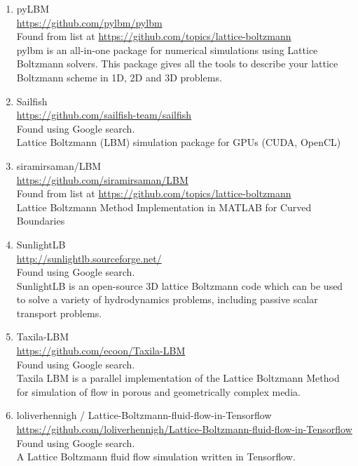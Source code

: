 \documentclass{article}
\begin{document}
\begin{enumerate}
	\item pyLBM
\\
	\href{https://github.com/pylbm/pylbm}{https://github.com/pylbm/pylbm}
\\
		Found from list at \href{https://github.com/topics/lattice-boltzmann}{https://github.com/topics/lattice-boltzmann}\\
	pylbm is an all-in-one package for numerical simulations using Lattice Boltzmann solvers.
	This package gives all the tools to describe your lattice Boltzmann scheme in 1D, 2D and 3D problems.
	
	\item Sailfish \\
	\href{https://github.com/sailfish-team/sailfish}{https://github.com/sailfish-team/sailfish}
\\
	Found using Google search.\\
	Lattice Boltzmann (LBM) simulation package for GPUs (CUDA, OpenCL)
	
	\item siramirsaman/LBM
\\
	\href{https://github.com/siramirsaman/LBM}{https://github.com/siramirsaman/LBM}
\\
		Found from list at \href{https://github.com/topics/lattice-boltzmann}{https://github.com/topics/lattice-boltzmann}\\
	Lattice Boltzmann Method Implementation in MATLAB for Curved Boundaries
	
	\item SunlightLB \\
	\href{http://sunlightlb.sourceforge.net/}{http://sunlightlb.sourceforge.net/}
\\
	Found using Google search.\\
	SunlightLB is an open-source 3D lattice Boltzmann code which can be used to solve a variety of hydrodynamics problems, including passive scalar transport problems.
	
	\item Taxila-LBM
\\
	\href{https://github.com/ecoon/Taxila-LBM}{https://github.com/ecoon/Taxila-LBM}
\\
	Found using Google search.\\
	Taxila LBM is a parallel implementation of the Lattice Boltzmann Method for simulation of flow in porous and geometrically complex media.
	
	\item  loliverhennigh /
Lattice-Boltzmann-fluid-flow-in-Tensorflow 
\\
	\href{https://github.com/loliverhennigh/Lattice-Boltzmann-fluid-flow-in-Tensorflow}{https://github.com/loliverhennigh/Lattice-Boltzmann-fluid-flow-in-Tensorflow}
\\
	Found using Google search.\\
	A Lattice Boltzmann fluid flow simulation written in Tensorflow. 
	

\end{enumerate}
\end{document}
